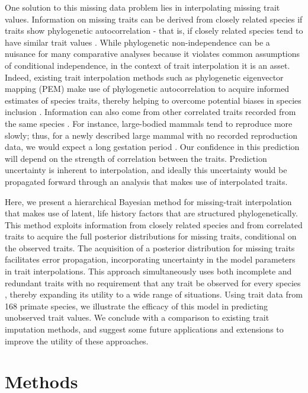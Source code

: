 One solution to this missing data problem lies in interpolating missing trait values.
Information on missing traits can be derived from closely related species if traits show phylogenetic autocorrelation - that is, if closely related species tend to have similar trait values \citep{Felsenstein1985}.
While phylogenetic non-independence can be a nuisance for many comparative analyses because it violates common assumptions of conditional independence, in the context of trait interpolation it is an asset.
Indeed, existing trait interpolation methods such as phylogenetic eigenvector mapping (PEM) make use of phylogenetic autocorrelation to acquire informed estimates of species traits, thereby helping to overcome potential biases in species inclusion \citep{Guenard2013}.
Information can also come from other correlated traits recorded from the same species \citep{Westoby2002, Poorter2006, Zheng2009}.
For instance, large-bodied mammals tend to reproduce more slowly; thus, for a newly described large mammal with no recorded reproduction data, we would expect a long gestation period \citep{Promislow1990}.
Our confidence in this prediction will depend on the strength of correlation between the traits.
Prediction uncertainty is inherent to interpolation, and ideally this uncertainty would be propagated forward through an analysis that makes use of interpolated traits.

Here, we present a hierarchical Bayesian method for missing-trait interpolation that makes use of latent, life history factors that are structured phylogenetically.
This method exploits information from closely related species and from correlated traits to acquire the full posterior distributions for missing traits, conditional on the observed traits.
The acquisition of a posterior distribution for missing traits facilitates error propagation, incorporating uncertainty in the model parameters in trait interpolations.
This approach simultaneously uses both incomplete and redundant traits with no requirement that any trait be observed for every species \citep{Guenard2013}, thereby expanding its utility to a wide range of situations.
Using trait data from 168 primate species, we illustrate the efficacy of this model in predicting unobserved trait values.
We conclude with a comparison to existing trait imputation methods, and suggest some future applications and extensions to improve the utility of these approaches.

\section{Methods}

